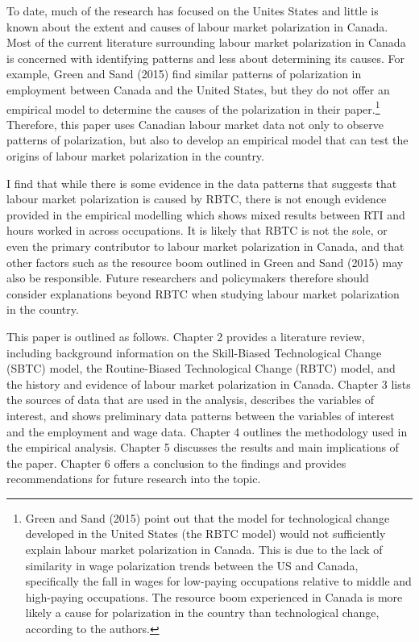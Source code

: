 \documentclass[undefended]{bumrp}
\begin{document}
To date, much of the research has focused on the Unites States and little is known about the extent and causes of labour market polarization in Canada. Most of the current literature surrounding labour market polarization in Canada is concerned with identifying patterns and less about determining its causes. For example, Green and Sand (2015) find similar patterns of polarization in employment between Canada and the United States, but they do not offer an empirical model to determine the causes of the polarization in their paper.\footnote{Green and Sand (2015) point out that the model for technological change developed in the United States (the RBTC model) would not sufficiently explain labour market polarization in Canada. This is due to the lack of similarity in wage polarization trends between the US and Canada, specifically the fall in wages for low-paying occupations relative to middle and high-paying occupations. The resource boom experienced in Canada is more likely a cause for polarization in the country than technological change, according to the authors.} Therefore, this paper uses Canadian labour market data not only to observe patterns of polarization, but also to develop an empirical model that can test the origins of labour market polarization in the country.

I find that while there is some evidence in the data patterns that suggests that labour market polarization is caused by RBTC, there is not enough evidence provided in the empirical modelling which shows mixed results between RTI and hours worked in across occupations. It is likely that RBTC is not the sole, or even the primary contributor to labour market polarization in Canada, and that other factors such as the resource boom outlined in Green and Sand (2015) may also be responsible. Future researchers and policymakers therefore should consider explanations beyond RBTC when studying labour market polarization in the country.

This paper is outlined as follows. Chapter 2 provides a literature review, including background information on the Skill-Biased Technological Change (SBTC) model, the Routine-Biased Technological Change (RBTC) model, and the history and evidence of labour market polarization in Canada. Chapter 3 lists the sources of data that are used in the analysis, describes the variables of interest, and shows preliminary data patterns between the variables of interest and the employment and wage data. Chapter 4 outlines the methodology used in the empirical analysis. Chapter 5 discusses the results and main implications of the paper. Chapter 6 offers a conclusion to the findings and provides recommendations for future research into the topic.
\end{document}
